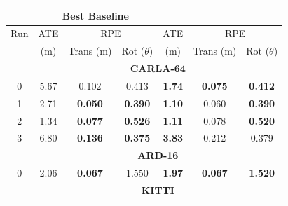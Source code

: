 \label{sec:slamindyenv}



\setlength{\tabcolsep}{1.5pt}
\begin{table}[t]
\scriptsize
\centering
\begin{tabular}{|ccccccc|}
\hline
\multicolumn{1}{|c|}{}           & \multicolumn{3}{c|}{\textbf{Best Baseline}}                                                                                            & \multicolumn{3}{c|}{\dslr{}}                                                                              \\ \hline
\multicolumn{1}{|c|}{Run}        & \multicolumn{1}{c|}{ATE}         & \multicolumn{2}{c|}{RPE}                                                          & \multicolumn{1}{c|}{ATE}            & \multicolumn{2}{c|}{RPE}                                          \\ \hline
\multicolumn{1}{|c|}{}           & \multicolumn{1}{c|}{(m)}         & \multicolumn{1}{c|}{Trans (m)}        & \multicolumn{1}{c|}{Rot ($\theta$)}         & \multicolumn{1}{c|}{(m)}            & \multicolumn{1}{c|}{Trans (m)}      & Rot ($\theta$)                \\ \hline
\multicolumn{1}{|c|}{}           & \multicolumn{6}{c|}{\textbf{CARLA-64}}                                                        \\ \hline
\multicolumn{1}{|c|}{0}          & \multicolumn{1}{c|}{5.67}        & \multicolumn{1}{c|}{0.102}            & \multicolumn{1}{c|}{0.413}                & \multicolumn{1}{c|}{\textbf{1.74}}  & \multicolumn{1}{c|}{\textbf{0.075}} & \textbf{0.412}              \\ \hline
\multicolumn{1}{|c|}{1}          & \multicolumn{1}{c|}{2.71}        & \multicolumn{1}{c|}{\textbf{0.050}}   & \multicolumn{1}{c|}{\textbf{0.390}}       & \multicolumn{1}{c|}{\textbf{1.10}}  & \multicolumn{1}{c|}{0.060}          & \textbf{0.390}              \\ \hline
\multicolumn{1}{|c|}{2}          & \multicolumn{1}{c|}{1.34}        & \multicolumn{1}{c|}{\textbf{0.077}}   & \multicolumn{1}{c|}{\textbf{0.526}}       & \multicolumn{1}{c|}{\textbf{1.11}}  & \multicolumn{1}{c|}{0.078}          & \textbf{0.520}              \\ \hline
\multicolumn{1}{|c|}{3}          & \multicolumn{1}{c|}{6.80}        & \multicolumn{1}{c|}{\textbf{0.136}}   & \multicolumn{1}{c|}{\textbf{0.375}}       & \multicolumn{1}{c|}{\textbf{3.83}}  & \multicolumn{1}{c|}{0.212}          & 0.379                       \\ \hline
\multicolumn{1}{|c|}{}           & \multicolumn{6}{c|}{\textbf{ARD-16}}                      \\ \hline
\multicolumn{1}{|c|}{0}          & \multicolumn{1}{c|}{2.06}        & \multicolumn{1}{c|}{\textbf{0.067}}   & \multicolumn{1}{c|}{1.550}                & \multicolumn{1}{c|}{\textbf{1.97}}  & \multicolumn{1}{c|}{\textbf{0.067}} & \textbf{1.520}                       \\ \hline
\multicolumn{1}{|c|}{}           & \multicolumn{6}{c|}{\textbf{KITTI}}                      \\ \hline


\end{tabular}
\end{table}
